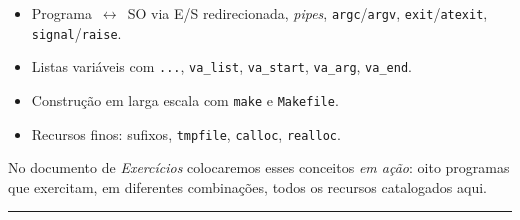 \documentclass[11pt,a4paper]{article}
\begin{document}
\begin{itemize}[leftmargin=*]
  \item Programa~$\leftrightarrow$~SO via E/S redirecionada, \emph{pipes}, \texttt{argc}/\texttt{argv}, \texttt{exit}/\texttt{atexit}, \texttt{signal}/\texttt{raise}.
  \item Listas vari\'aveis com \texttt{...}, \texttt{va\_list}, \texttt{va\_start}, \texttt{va\_arg}, \texttt{va\_end}.
  \item Constru\c{c}\~ao em larga escala com \texttt{make} e \texttt{Makefile}.
  \item Recursos finos: sufixos, \texttt{tmpfile}, \texttt{calloc}, \texttt{realloc}.
\end{itemize}

No documento de \emph{Exerc\'icios} colocaremos esses conceitos \emph{em a\c{c}\~ao}: oito programas que exercitam, em diferentes combina\c{c}\~oes, todos os recursos catalogados aqui.

\vspace{1em}
\begin{center}\rule{0.5\textwidth}{0.4pt}\end{center}
\end{document}
